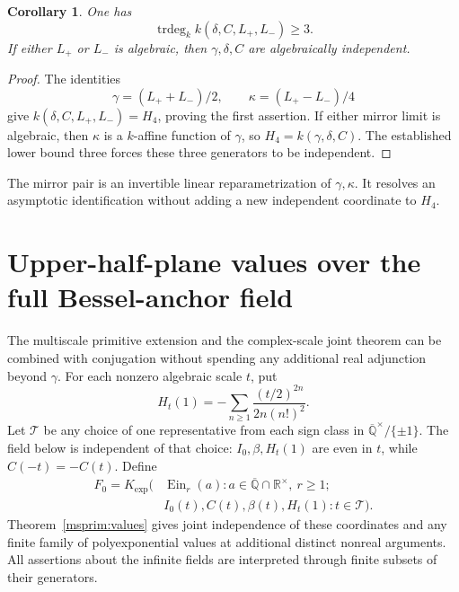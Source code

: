 \documentclass[11pt]{article}
\newtheorem{corollary}[theorem]{Corollary}
\theoremstyle{definition}
\theoremstyle{remark}
\newcommand{\Ein}{\operatorname{Ein}}
\begin{document}
\begin{corollary}\label{cor:limits}
One has
\[
 \operatorname{trdeg}_k k(\delta,C,L_+,L_-)\ge3.
\]
If either $L_+$ or $L_-$ is algebraic, then
$\gamma,\delta,C$ are algebraically independent.
\end{corollary}
\begin{proof}
The identities
\[
 \gamma=(L_++L_-)/2,\qquad \kappa=(L_+-L_-)/4
\]
give $k(\delta,C,L_+,L_-)=H_4$, proving the first assertion.
If either mirror limit is algebraic, then $\kappa$ is a
$k$-affine function of $\gamma$, so $H_4=k(\gamma,\delta,C)$.
The established lower bound three forces these three generators
to be independent.
\end{proof}
The mirror pair is an invertible linear reparametrization of
$\gamma,\kappa$. It resolves an asymptotic identification without
adding a new independent coordinate to $H_4$.



\section{Upper-half-plane values over the full Bessel-anchor field}
\label{anchor:section}

The multiscale primitive extension and the complex-scale joint theorem
can be combined with conjugation without spending any additional real
adjunction beyond $\gamma$.
For each nonzero algebraic scale $t$, put
\[
 H_t(1)=-\sum_{n\ge1}\frac{(t/2)^{2n}}{2n(n!)^2}.
\]
Let $\mathcal T$ be any choice of one representative from each sign
class in $\overline{\mathbb Q}^{\times}/\{\pm1\}$. The field below is
independent of that choice: $I_0,\beta,H_t(1)$ are even in $t$, while
$C(-t)=-C(t)$.
Define
\begin{equation}\label{anchor:field}
 \begin{split}
 F_0=K_{\exp}\bigl(&\Ein_r(a)
          :a\in\overline{\mathbb Q}\cap\mathbb R^{\times},\ r\ge1;\\
                  &I_0(t),C(t),\beta(t),H_t(1):t\in\mathcal T\bigr).
 \end{split}
\end{equation}
Theorem~\ref{msprim:values} 
gives joint independence of these coordinates
and any finite family of polyexponential values at additional distinct
nonreal arguments. All assertions about the infinite fields are
interpreted through finite subsets of their generators.
\end{document}
